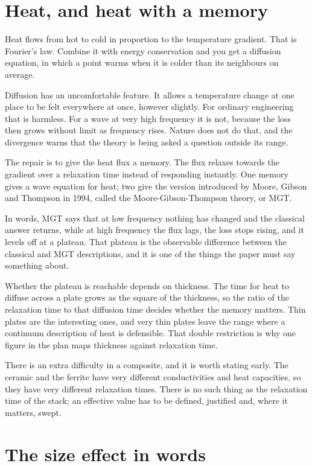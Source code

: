 \documentclass[11pt]{article}
\begin{document}
\section{Heat, and heat with a memory}

Heat flows from hot to cold in proportion to the temperature gradient. That is Fourier's law. Combine it with
energy conservation and you get a diffusion equation, in which a point warms when it is colder than its
neighbours on average.

Diffusion has an uncomfortable feature. It allows a temperature change at one place to be felt everywhere at
once, however slightly. For ordinary engineering that is harmless. For a wave at very high frequency it is
not, because the loss then grows without limit as frequency rises. Nature does not do that, and the divergence
warns that the theory is being asked a question outside its range.

The repair is to give the heat flux a memory. The flux relaxes towards the gradient over a relaxation time
instead of responding instantly. One memory gives a wave equation for heat; two give the version introduced by
Moore, Gibson and Thompson in 1994, called the Moore-Gibson-Thompson theory, or MGT.

In words, MGT says that at low frequency nothing has changed and the classical answer returns, while at high
frequency the flux lags, the loss stops rising, and it levels off at a plateau. That plateau is the observable
difference between the classical and MGT descriptions, and it is one of the things the paper must say
something about.

Whether the plateau is reachable depends on thickness. The time for heat to diffuse across a plate grows as
the square of the thickness, so the ratio of the relaxation time to that diffusion time decides whether the
memory matters. Thin plates are the interesting ones, and very thin plates leave the range where a continuum
description of heat is defensible. That double restriction is why one figure in the plan maps thickness
against relaxation time.

There is an extra difficulty in a composite, and it is worth stating early. The ceramic and the ferrite have
very different conductivities and heat capacities, so they have very different relaxation times. There is no
such thing as the relaxation time of the stack; an effective value has to be defined, justified and, where it
matters, swept.

\section{The size effect in words}
\end{document}
